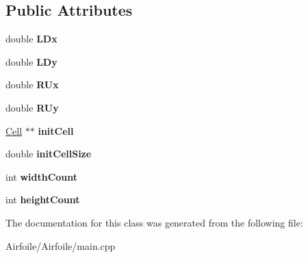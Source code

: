 \subsection*{Public Attributes}
\begin{DoxyCompactItemize}
\item 
\mbox{\label{class_rectangle_a16cadf877615427acdfb270a497cf9d3}} 
double {\bfseries L\+Dx}
\item 
\mbox{\label{class_rectangle_aadb74c59f450be45a8415393d32f3949}} 
double {\bfseries L\+Dy}
\item 
\mbox{\label{class_rectangle_a8a1d18e28b26a80283aa10044449c13c}} 
double {\bfseries R\+Ux}
\item 
\mbox{\label{class_rectangle_a91ec7404b7c9f644cc6ff2dbc5a22787}} 
double {\bfseries R\+Uy}
\item 
\mbox{\label{class_rectangle_a3e27272c8482223f9768203630d3ca77}} 
\mbox{\hyperlink{class_cell}{Cell}} $\ast$$\ast$ {\bfseries init\+Cell}
\item 
\mbox{\label{class_rectangle_a80262992a518214a5880955e687abebc}} 
double {\bfseries init\+Cell\+Size}
\item 
\mbox{\label{class_rectangle_a1920d8864417039f61c733c20ce0aeaa}} 
int {\bfseries width\+Count}
\item 
\mbox{\label{class_rectangle_aef21308f8a2421d7bc3e5679db8b18bc}} 
int {\bfseries height\+Count}
\end{DoxyCompactItemize}


The documentation for this class was generated from the following file\+:\begin{DoxyCompactItemize}
\item 
Airfoile/\+Airfoile/main.\+cpp\end{DoxyCompactItemize}
